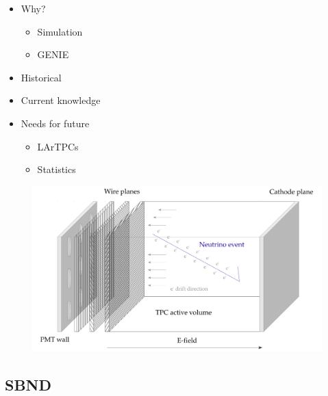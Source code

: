     \begin{itemize}

        \item Why?
        
        \begin{itemize}

            \item Simulation
            \item GENIE

        \end{itemize}
        
        \item Historical
        \item Current knowledge
        \item Needs for future
        
        \begin{itemize}

            \item LArTPCs
            \item Statistics

        \end{itemize}

    \end{itemize}

    
    
    \begin{figure}[h!]
        \center
        \includegraphics[width=\textwidth]{images/LArTPC.pdf}
    \end{figure}

\subsection{SBND}    

